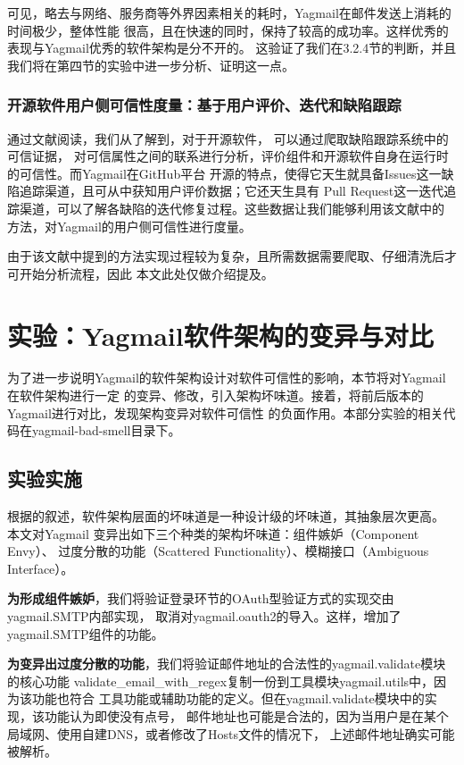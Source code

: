 \documentclass[UTF8,12pt,a4paper]{ctexart}
\begin{document}
    可见，略去与网络、服务商等外界因素相关的耗时，Yagmail在邮件发送上消耗的时间极少，整体性能
    很高，且在快速的同时，保持了较高的成功率。这样优秀的表现与Yagmail优秀的软件架构是分不开的。
    这验证了我们在3.2.4节的判断，并且我们将在第四节的实验中进一步分析、证明这一点。

    \subsubsection{开源软件用户侧可信性度量：基于用户评价、迭代和缺陷跟踪}

    通过文献阅读，我们从\cite{opensource}了解到，对于开源软件，
    可以通过爬取缺陷跟踪系统中的可信证据，
    对可信属性之间的联系进行分析，评价组件和开源软件自身在运行时的可信性。而Yagmail在GitHub平台
    开源的特点，使得它天生就具备Issues这一缺陷追踪渠道，且可从中获知用户评价数据；它还天生具有
    Pull Request这一迭代追踪渠道，可以了解各缺陷的迭代修复过程。这些数据让我们能够利用该文献中的
    方法，对Yagmail的用户侧可信性进行度量。
    
    由于该文献中提到的方法实现过程较为复杂，且所需数据需要爬取、仔细清洗后才可开始分析流程，因此
    本文此处仅做介绍提及。

\newpage
\section{实验：Yagmail软件架构的变异与对比}
    
    为了进一步说明Yagmail的软件架构设计对软件可信性的影响，本节将对Yagmail在软件架构进行一定
    的变异、修改，引入架构坏味道。接着，将前后版本的Yagmail进行对比，发现架构变异对软件可信性
    的负面作用。本部分实验的相关代码在yagmail-bad-smell目录下。
    
\subsection{实验实施}

    根据\cite{thebook}的叙述，软件架构层面的坏味道是一种设计级的坏味道，其抽象层次更高。
    本文对Yagmail
    变异出如下三个种类的架构坏味道：组件嫉妒（Component Envy）、
    过度分散的功能（Scattered Functionality）、模糊接口（Ambiguous Interface）。
    
    \textbf{为形成组件嫉妒}，我们将验证登录环节的OAuth型验证方式的实现交由yagmail.SMTP内部实现，
    取消对yagmail.oauth2的导入。这样，增加了yagmail.SMTP组件的功能。
    
    \textbf{为变异出过度分散的功能}，我们将验证邮件地址的合法性的yagmail.validate模块的核心功能
    validate\_email\_with\_regex复制一份到工具模块yagmail.utils中，因为该功能也符合
    工具功能或辅助功能的定义。但在yagmail.validate模块中的实现，该功能认为即使没有点号，
    邮件地址也可能是合法的，因为当用户是在某个局域网、使用自建DNS，或者修改了Hosts文件的情况下，
    上述邮件地址确实可能被解析。
    
\end{document}
